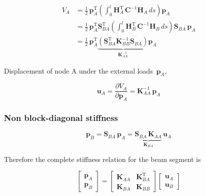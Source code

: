 \begin{align}
V_A &= \frac{1}{2}\,\boldsymbol{p}_A^\mathrm{T}
\left(\int_{0}^{l} \boldsymbol{H}_A^\mathrm{T}\,
\boldsymbol{C}^{-1}\boldsymbol{H}_A\,ds\right)
\boldsymbol{p}_A \\
&= \frac{1}{2}\,\boldsymbol{p}_A^\mathrm{T}
\boldsymbol{S}_{BA}^\mathrm{T}\left(\int_{0}^{l} \boldsymbol{H}_B^\mathrm{T}\,
\boldsymbol{C}^{-1}\boldsymbol{H}_B\,ds\right)\boldsymbol{S}_{BA}\,\boldsymbol{p}_A \\
&= \frac{1}{2}\,\boldsymbol{p}_A^\mathrm{T}
\underbrace{
\left(\boldsymbol{S}_{BA}^\mathrm{T}\boldsymbol{K}_{BB}^{-1}\boldsymbol{S}_{BA}\right)
}_{\boldsymbol{K}_{AA}^{-1}}
\boldsymbol{p}_A 
\end{align}

Displacement of node A under the external loads~$\boldsymbol{p}_A$,

\begin{equation}
\boldsymbol{u}_{A} = \frac{\partial V_A}{\partial \boldsymbol{p}_A} = \boldsymbol{K}_{AA}^{-1}\,\boldsymbol{p}_A
\end{equation}

\subsubsection*{Non block-diagonal stiffness}

\begin{equation}
\boldsymbol{p}_B = \boldsymbol{S}_{BA}\,\boldsymbol{p}_A =
\underbrace{
\boldsymbol{S}_{BA}\,\boldsymbol{K}_{AA}
}_{\boldsymbol{K}_{BA}}
\,\boldsymbol{u}_A
\end{equation}

Therefore the complete stiffness relation for the beam segment is

\begin{equation}
\begin{bmatrix}
\boldsymbol{p}_A \\ \boldsymbol{p}_B
\end{bmatrix}
=
\begin{bmatrix}
\boldsymbol{K}_{AA} & \boldsymbol{K}_{BA}^\mathrm{T} \\
\boldsymbol{K}_{BA} & \boldsymbol{K}_{BB}
\end{bmatrix}
\begin{bmatrix}
\boldsymbol{u}_A \\ \boldsymbol{u}_B
\end{bmatrix}
\end{equation}

